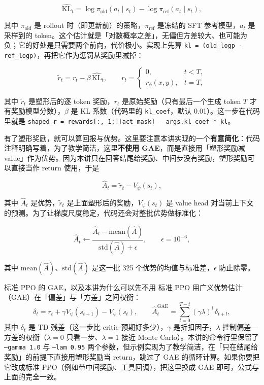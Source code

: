 $$
\widehat{\mathrm{KL}}_t
= \log \pi_{\text{old}}(a_t \mid s_t) - \log \pi_{\text{ref}}(a_t \mid s_t),
$$

其中 $\pi_{\text{old}}$ 是 rollout 时（即更新前）的策略，$\pi_{\text{ref}}$ 是冻结的 SFT 参考模型，$a_t$ 是采样到的 token。这个估计就是「对数概率之差」，无偏但方差较大、也可能为负；它的好处是只需要两个前向，代价极小。实现上先算 \texttt{kl = (old\_logp - ref\_logp)}，再把它作为惩罚从奖励里减掉：

$$
\tilde r_t = r_t - \beta\,\widehat{\mathrm{KL}}_t,
\qquad
r_t =
\begin{cases}
0, & t < T,\\[2pt]
r_\phi(x, y), & t = T,
\end{cases}
$$

其中 $\tilde r_t$ 是塑形后的逐 token 奖励，$r_t$ 是原始奖励（只有最后一个生成 token $T$ 才有奖励模型分数），$\beta$ 是 KL 系数（代码里的 \texttt{kl\_coef}，默认 0.01）。这一步在代码里就是 \texttt{shaped\_r = rewards[:, 1:][act\_mask] - args.kl\_coef * kl}。

有了塑形奖励，就可以算回报与优势。这里要注意本讲实现的一个\textbf{有意简化}：代码注释明确写着，为了教学简洁，这里\textbf{不使用 GAE}，而是直接用「塑形奖励减 value」作为优势。因为本讲只在回答结尾给奖励、中间步没有奖励，塑形奖励可以直接当作 return 使用，于是

$$
\hat A_t = \tilde r_t - V_\psi(s_t),
$$

其中 $\hat A_t$ 是优势，$\tilde r_t$ 是上面塑形后的奖励，$V_\psi(s_t)$ 是 value head 对当前上下文的预测。为了让梯度尺度稳定，代码还会对整批优势做标准化：

$$
\hat A_t \leftarrow \frac{\hat A_t - \mathrm{mean}(\hat A)}
{\mathrm{std}(\hat A) + \epsilon},
\qquad \epsilon = 10^{-6},
$$

其中 $\mathrm{mean}(\hat A)$、$\mathrm{std}(\hat A)$ 是这一批 325 个优势的均值与标准差，$\epsilon$ 防止除零。

\begin{knowledgebox}{标准 PPO 的 GAE，以及本讲为什么可以先不用}
标准 PPO 用广义优势估计（GAE）在「偏差」与「方差」之间权衡：
$$
\delta_t = r_t + \gamma V_\psi(s_{t+1}) - V_\psi(s_t), \qquad
\hat A_t^{\text{GAE}} = \sum_{l=0}^{T-t}(\gamma\lambda)^{l}\,\delta_{t+l},
$$
其中 $\delta_t$ 是 TD 残差（这一步比 critic 预期好多少），$\gamma$ 是折扣因子，$\lambda$ 控制偏差—方差的权衡（$\lambda=0$ 只看一步、$\lambda=1$ 接近 Monte Carlo）。本讲的命令行里保留了 \texttt{--gamma 1.0} 与 \texttt{--lam 0.95} 两个参数，但示例实现为了教学简洁，在「只在结尾给奖励」的前提下直接用塑形奖励当 return，跳过了 GAE 的循环计算。如果你要把它改成标准 PPO（例如带中间奖励、工具回调），把这里换成 GAE 即可，公式与上面的完全一致。
\end{knowledgebox}

